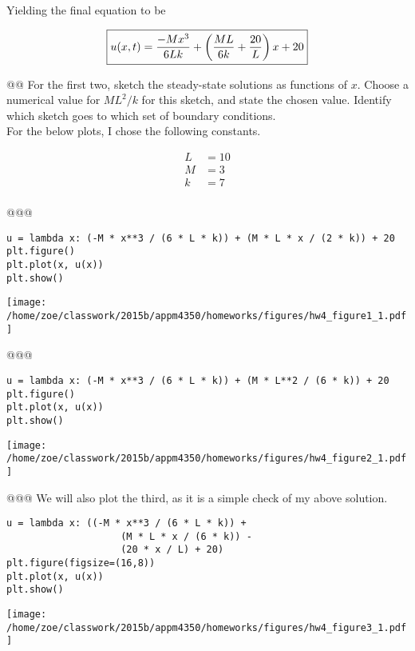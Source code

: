 \documentclass[10pt]{article}
\begin{document}
\begin{easylist}[enumerate]
    Yielding the final equation to be

    \[
        \boxed{%
            u(x, t) = \frac{-Mx^3}{6Lk} + \left(\frac{ML}{6k} + \frac{20}{L}\right)x + 20
        }
    \]

    @@ For the first two, sketch the steady-state solutions as functions of $x$. Choose a numerical value for $ML^2 / k$
    for this sketch, and state the chosen value. Identify which sketch goes to which set of boundary conditions.\\



    For the below plots, I chose the following constants.

    \begin{align*}
        L &= 10\\
        M &= 3\\
        k &= 7\\
    \end{align*}

    @@@

\weave

\begin{verbatim}
u = lambda x: (-M * x**3 / (6 * L * k)) + (M * L * x / (2 * k)) + 20
plt.figure()
plt.plot(x, u(x))
plt.show()
\end{verbatim}
\texttt{[image: /home/zoe/classwork/2015b/appm4350/homeworks/figures/hw4\_figure1\_1.pdf]}

\noweave

    @@@

\weave

\begin{verbatim}
u = lambda x: (-M * x**3 / (6 * L * k)) + (M * L**2 / (6 * k)) + 20
plt.figure()
plt.plot(x, u(x))
plt.show()
\end{verbatim}
\texttt{[image: /home/zoe/classwork/2015b/appm4350/homeworks/figures/hw4\_figure2\_1.pdf]}

\noweave

    @@@ We will also plot the third, as it is a simple check of my above solution.

\weave

\begin{verbatim}
u = lambda x: ((-M * x**3 / (6 * L * k)) +
                    (M * L * x / (6 * k)) -
                    (20 * x / L) + 20)
plt.figure(figsize=(16,8))
plt.plot(x, u(x))
plt.show()
\end{verbatim}
\texttt{[image: /home/zoe/classwork/2015b/appm4350/homeworks/figures/hw4\_figure3\_1.pdf]}


\end{easylist}
\end{document}
